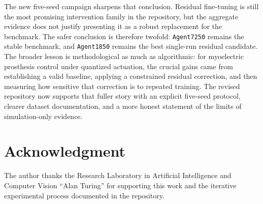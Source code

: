 \documentclass[conference]{IEEEtran}
\begin{document}
The new five-seed campaign sharpens that conclusion. Residual fine-tuning is still the most promising intervention family in the repository, but the aggregate evidence does not justify presenting it as a robust replacement for the benchmark. The safer conclusion is therefore twofold: \texttt{Agent7250} remains the stable benchmark, and \texttt{Agent1850} remains the best single-run residual candidate. The broader lesson is methodological as much as algorithmic: for myoelectric prosthesis control under quantized actuation, the crucial gains came from establishing a valid baseline, applying a constrained residual correction, and then measuring how sensitive that correction is to repeated training. The revised repository now supports that fuller story with an explicit five-seed protocol, clearer dataset documentation, and a more honest statement of the limits of simulation-only evidence.

\clearpage
\section*{Acknowledgment}
The author thanks the Research Laboratory in Artificial Intelligence and Computer Vision ``Alan Turing'' for supporting this work and the iterative experimental process documented in the repository.



\end{document}
